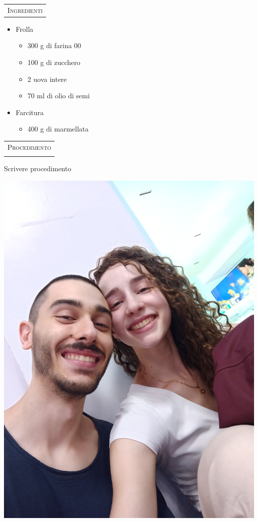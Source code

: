 \noindent
\begin{minipage}[t][\textheight][t]{\textwidth}


    \begin{minipage}[t]{0.3\textwidth}
        \vspace{2.5cm}

        \begin{tabularx}{\linewidth}{X}
        {\Large \textsc{Ingredienti}} \\ %
        \end{tabularx}

		\begin{itemize}[label={}, left=2pt]
		\item Frolla
        \begin{itemize}[label={}, left=10pt]
            \item 300 g di farina 00
            \item 100 g di zucchero
            \item 2 uova intere
            \item 70 ml di olio di semi
        \end{itemize}
        \item Farcitura
        \begin{itemize}[label={}, left=10pt]
        		\item 400 g di marmellata
        \end{itemize}
       	\end{itemize}
    \end{minipage}%
    \hfill
    \begin{minipage}[t]{0.65\textwidth}
        \begin{tabularx}{\linewidth}{X}
        \\
        {\Large \textsc{Procedimento}} \\ \\%
        \end{tabularx}
		Scrivere procedimento
        
     	\includegraphics[valign=t, width=0.5\linewidth]{parts/dolci/images/test}
    \end{minipage}
    

\end{minipage}
